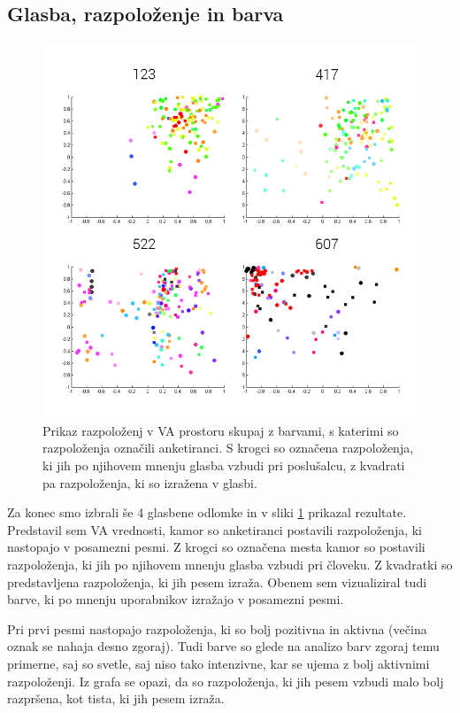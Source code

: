 \documentclass[a4paper, 12pt]{book}
\begin{document}
{\subsection{Glasba, razpoloženje in barva}

\begin{figure}[hbt]
\centering
\includegraphics[width=12.5cm]{images/moodmusic.png}

\caption{Prikaz razpoloženj v VA prostoru skupaj z barvami, s katerimi so razpoloženja označili anketiranci. S krogci so označena razpoloženja, ki jih po njihovem mnenju glasba vzbudi pri poslušalcu, z kvadrati pa razpoloženja, ki so izražena v glasbi.}
\label{moodmusic}
\end{figure} 

Za konec smo izbrali še 4 glasbene odlomke in v sliki \ref{moodmusic} prikazal rezultate. Predstavil sem VA vrednosti, kamor so anketiranci postavili razpoloženja, ki nastopajo v posamezni pesmi. Z krogci so označena mesta kamor so postavili razpoloženja, ki jih po njihovem mnenju glasba vzbudi pri človeku. Z kvadratki so predstavljena razpoloženja, ki jih pesem izraža. Obenem sem vizualiziral tudi barve, ki po mnenju uporabnikov izražajo v posamezni pesmi. 

Pri prvi pesmi nastopajo razpoloženja, ki so bolj pozitivna in aktivna (večina oznak se nahaja desno zgoraj). Tudi barve so glede na analizo barv zgoraj temu primerne, saj so svetle, saj niso tako intenzivne, kar se ujema z bolj aktivnimi razpoloženji. Iz grafa se opazi, da so razpoloženja, ki jih pesem vzbudi malo bolj razpršena, kot tista, ki jih pesem izraža.

}
\end{document}
